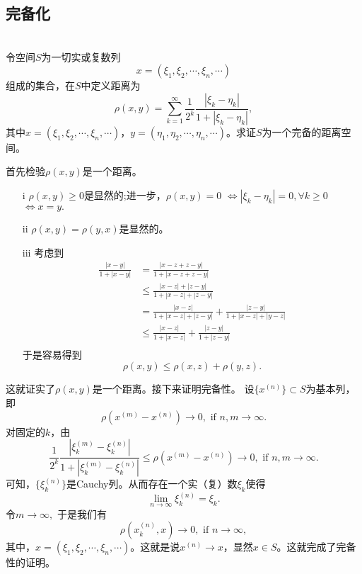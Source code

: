 \subsection{完备化}
\begin{exercise}
\hfill\\
令空间$S$为一切实或复数列
$$x=(\xi_1,\xi_2,\cdots,\xi_n,\cdots)$$
组成的集合，在$S$中定义距离为
$$\rho(x,y)=\sum_{k=1}^{\infty}\frac{1}{2^k}\frac{|\xi_k-\eta_k|}{1+|\xi_k-\eta_k|},$$
其中$x=(\xi_1,\xi_2,\cdots,\xi_n,\cdots)$，$y=(\eta_1,\eta_2,\cdots,\eta_n,\cdots)$。求证$S$为一个完备的距离空间。

首先检验$\rho(x,y)$是一个距离。
\begin{enumerate}
\item[i] $\rho(x,y)\geq0$是显然的;进一步，$\rho(x,y)=0$ $\Longleftrightarrow|\xi_k-\eta_k|=0,\forall k\geq0$ $\Longleftrightarrow x=y.$
\item[ii] $\rho(x,y)=\rho(y,x)$是显然的。
\item[iii] 考虑到
\begin{align*}
\frac{|x-y|}{1+|x-y|}&=\frac{|x-z+z-y|}{1+|x-z+z-y|}\\
&\leq\frac{|x-z|+|z-y|}{1+|x-z|+|z-y|}\\
&=\frac{|x-z|}{1+|x-z|+|z-y|}+\frac{|z-y|}{1+|x-z|+|y-z|}\\
&\leq\frac{|x-z|}{1+|x-z|}+\frac{|z-y|}{1+|z-y|}\\
\end{align*}
于是容易得到
$$\rho(x,y)\leq\rho(x,z)+\rho(y,z).$$
\end{enumerate}
这就证实了$\rho(x,y)$是一个距离。接下来证明完备性。
设$\{x^{(n)}\}\subset S$为基本列，即
$$\rho(x^{(m)}-x^{(n)})\rightarrow0,\text{ if }n,m\rightarrow\infty.$$
对固定的$k$，由$$\frac{1}{2^k}\frac{|\xi^{(m)}_k-\xi^{(n)}_k|}{1+|\xi^{(m)}_k-\xi^{(n)}_k|}\leq\rho(x^{(m)}-x^{(n)})\rightarrow0,\text{ if }n,m\rightarrow\infty.$$
可知，$\{\xi_k^{(n)}\}$是Cauchy列。从而存在一个实（复）数$\xi_k$使得
$$\lim_{n\rightarrow\infty}\xi_k^{(n)}=\xi_k.$$
令$m\rightarrow\infty,$
于是我们有$$\rho(x_k^{(n)},x)\rightarrow0,\text{ if }n\rightarrow\infty,$$
其中，$x=(\xi_1,\xi_2,\cdots,\xi_n,\cdots)$。这就是说$x^{(n)}\rightarrow x$，显然$x\in S$。这就完成了完备性的证明。
\end{exercise}

